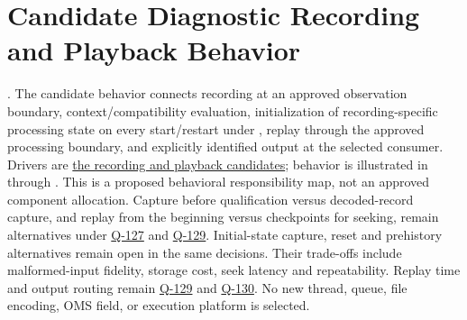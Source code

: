 \section{Candidate Diagnostic Recording and Playback Behavior}
. The candidate behavior connects recording at an approved observation boundary, context/compatibility evaluation, initialization of recording-specific processing state on every start/restart under , replay through the approved processing boundary, and explicitly identified output at the selected consumer. Drivers are \hyperref[Table:RecordingPlaybackRequirements]{the recording and playback candidates}; behavior is illustrated in  through . This is a proposed behavioral responsibility map, not an approved component allocation. Capture before qualification versus decoded-record capture, and replay from the beginning versus checkpoints for seeking, remain alternatives under \hyperref[Question:Q-127]{Q-127} and \hyperref[Question:Q-129]{Q-129}. Initial-state capture, reset and prehistory alternatives remain open in the same decisions. Their trade-offs include malformed-input fidelity, storage cost, seek latency and repeatability. Replay time and output routing remain \hyperref[Question:Q-129]{Q-129} and \hyperref[Question:Q-130]{Q-130}. No new thread, queue, file encoding, OMS field, or execution platform is selected.
